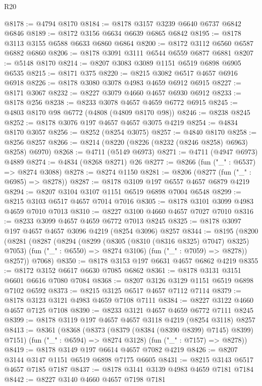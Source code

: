 \begin{lexlean}{R20}
\begin{coremodule}
@8178 := @4794 @8170
@8184 := @8178 @3157 @3239 @6640 @6737 @6842 @6846
@8189 := @8172 @3156 @6634 @6639 @6865 @6842
@8195 := @8178 @3113 @3155 @6588 @6633 @6860 @6864
@8200 := @8172 @3112 @6560 @6587 @6882 @6860
@8206 := @8178 @3091 @3111 @6544 @6559 @6877 @6881
@8207 := @5148 @8170
@8214 := @8207 @3083 @3089 @1151 @6519 @6898 @6905 @6535
@8215 := @8171 @375
@8220 := @8215 @3082 @6517 @4657 @6916 @6918
@8226 := @8178 @3080 @3078 @4983 @4659 @6912 @6915
@8227 := @8171 @3067
@8232 := @8227 @3079 @4660 @4657 @6930 @6912
@8233 := @8178 @256
@8238 := @8233 @3078 @4657 @4659 @6772 @6915
@8245 := @4803 @8170 @98 @6772 (@4808 (@4809 @8170 @98))
@8246 := @8238 @8245
@8252 := @8178 @3076 @197 @4657 @4657 @3075 @4219
@8254 := @4834 @8170 @3057
@8256 := @8252 (@8254 @3075)
@8257 := @4840 @8170
@8258 := @8256 @8257
@8266 := @8214 (@8220 (@8226 (@8232 (@8246 @8258) @6963) @8258) @6970)
@8268 := @4711 (@5149 @6973)
@8271 := @4711 (@4947 @6973) @4889
@8274 := @4834 (@8268 @8271) @26
@8277 := @8266 (fun ("_" : @6537) => @8274 @3088)
@8278 := @8274 @1150
@8281 := @8206 (@8277 (fun ("_" : @6985) => @8278))
@8287 := @8178 @3109 @197 @6557 @4657 @6879 @4219
@8294 := @8207 @3104 @3107 @1151 @6519 @6898 @7004 @6548
@8299 := @8215 @3103 @6517 @4657 @7014 @7016
@8305 := @8178 @3101 @3099 @4983 @4659 @7010 @7013
@8310 := @8227 @3100 @4660 @4657 @7027 @7010
@8316 := @8233 @3099 @4657 @4659 @6772 @7013 @8245
@8325 := @8178 @3097 @197 @4657 @4657 @3096 @4219 (@8254 @3096) @8257
@8344 := @8195
    (@8200
      (@8281
        (@8287
          (@8294
            (@8299 (@8305 (@8310 (@8316 @8325) @7047) @8325) @7053)
            (fun ("_" : @6550) => @8274 @3106)
            (fun ("_" : @7059) => @8278))
          @8257))
      @7068)
@8350 := @8178 @3153 @197 @6631 @4657 @6862 @4219
@8355 := @8172 @3152 @6617 @6630 @7085 @6862
@8361 := @8178 @3131 @3151 @6601 @6616 @7080 @7084
@8368 := @8207 @3126 @3129 @1151 @6519 @6898 @7102 @6592
@8373 := @8215 @3125 @6517 @4657 @7112 @7114
@8379 := @8178 @3123 @3121 @4983 @4659 @7108 @7111
@8384 := @8227 @3122 @4660 @4657 @7125 @7108
@8390 := @8233 @3121 @4657 @4659 @6772 @7111 @8245
@8399 := @8178 @3119 @197 @4657 @4657 @3118 @4219 (@8254 @3118) @8257
@8413 := @8361
    (@8368
      (@8373 (@8379 (@8384 (@8390 @8399) @7145) @8399) @7151)
      (fun ("_" : @6594) => @8274 @3128)
      (fun ("_" : @7157) => @8278))
@8419 := @8178 @3149 @197 @6614 @4657 @7082 @4219
@8426 := @8207 @3144 @3147 @1151 @6519 @6898 @7175 @6605
@8431 := @8215 @3143 @6517 @4657 @7185 @7187
@8437 := @8178 @3141 @3139 @4983 @4659 @7181 @7184
@8442 := @8227 @3140 @4660 @4657 @7198 @7181

\end{coremodule}
\end{lexlean}
